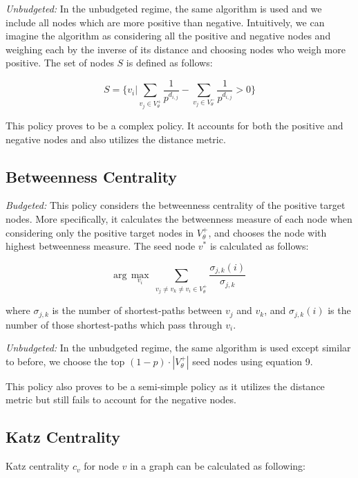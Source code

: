 \textit{Unbudgeted:}
In the unbudgeted regime, the same algorithm is used and we include all nodes which are more positive than negative. Intuitively, we can imagine the algorithm as considering all the positive and negative nodes and weighing each by the inverse of its distance and choosing nodes who weigh more positive. The set of nodes $S$ is defined as follows:

\begin{equation}
S = \{ v_i |  \sum_{v_j \in V_\theta^+} \frac{1}{p^{d_{i,j}}} -  \sum_{v_j \in V_{\theta}^-} \frac{1}{p^{d_{i,j}}} > 0 \}
\end{equation}

This policy proves to be a complex policy. It accounts for both the positive and negative nodes and also utilizes the distance metric.

\subsection{Betweenness Centrality}
\textit{Budgeted:}
This policy considers the betweenness centrality of the positive target nodes. More specifically, it calculates the betweenness measure of each node when considering only the positive target nodes in $V_\theta^+$, and chooses the node with highest betweenness measure. The seed node $v^*$ is calculated as follows:

\begin{equation}
	\text{arg}\,\max\limits_{v_i}\  \sum_{v_j \neq v_k \neq v_i  \in V_\theta^+} \frac{\sigma_{j,k}(i)}{\sigma_{j,k}}
\end{equation}

where $\sigma_{j,k}$ is the number of shortest-paths between $v_j$ and $v_k$, and $\sigma_{j,k}(i)$ is the number of those shortest-paths which pass through $v_i$.

\textit{Unbudgeted:}
In the unbudgeted regime, the same algorithm is used except similar to before, we choose the top $(1-p) \cdot |V_\theta^+|$ seed nodes using equation 9.

This policy also proves to be a semi-simple policy as it utilizes the distance metric but still fails to account for the negative nodes. 

\subsection{Katz Centrality}

Katz centrality $c_v$ for node $v$ in a graph can be calculated as following:

